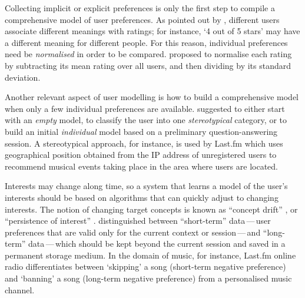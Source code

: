 Collecting implicit or explicit preferences is only the first step to compile a comprehensive model of user preferences.
As pointed out by \citet{Hofmann04}, different users associate different meanings with ratings; for instance, `4 out of 5 stars' may have a different meaning for different people. 
For this reason, individual preferences need be \emph{normalised} in order to be compared. 
\citet{Goldberg01} proposed to normalise each rating by subtracting its mean rating over all users, and then dividing by its standard deviation.

Another relevant aspect of user modelling is how to build a comprehensive model when only a few individual preferences are available.
\citet{Dieterich93} suggested to either start with an \emph{empty} model, to classify the user into one \emph{stereotypical} category, or to build an initial \emph{individual} model based on a preliminary question-answering session. 
A stereotypical approach, for instance, is used by Last.fm which uses geographical position obtained from the IP address of unregistered users to  recommend musical events taking place in the area where users are located.

Interests may change along time, so a system that learns a model of the user's interests should be based on algorithms that can quickly adjust to changing interests.
The notion of changing target concepts is known as ``concept drift'' \cite{Billsus07}, or ``persistence of interest'' \cite{Lieberman95}.
\citet{Dieterich93} distinguished between ``short-term'' data\,---\,user preferences that are valid only for the current context or session\,---\,and ``long-term'' data\,---\,which should be kept beyond the current session and saved in a permanent storage medium. 
In the domain of music, for instance, Last.fm online radio differentiates between `skipping' a song (short-term negative preference) and `banning' a song (long-term negative preference) from a personalised music channel.




